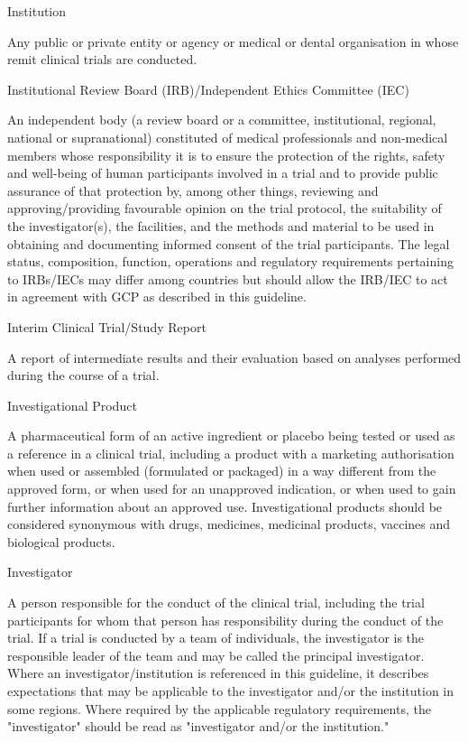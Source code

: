 \documentclass[11pt]{article}
\begin{document}
Institution


Any public or private entity or agency or medical or dental organisation in whose remit clinical trials are conducted.


Institutional Review Board (IRB)/Independent Ethics Committee (IEC)


An independent body (a review board or a committee, institutional, regional, national or supranational) constituted of medical professionals and non-medical members whose responsibility it is to ensure the protection of the rights, safety and well-being of human participants involved in a trial and to provide public assurance of that protection by, among other things, reviewing and approving/providing favourable opinion on the trial protocol, the suitability of the investigator(s), the facilities, and the methods and material to be used in obtaining and documenting informed consent of the trial participants. The legal status, composition, function, operations and regulatory requirements pertaining to IRBs/IECs may differ among countries but should allow the IRB/IEC to act in agreement with GCP as described in this guideline.


Interim Clinical Trial/Study Report


A report of intermediate results and their evaluation based on analyses performed during the course of a trial.


Investigational Product


A pharmaceutical form of an active ingredient or placebo being tested or used as a reference in a clinical trial, including a product with a marketing authorisation when used or assembled (formulated or packaged) in a way different from the approved form, or when used for an unapproved indication, or when used to gain further information about an approved use. Investigational products should be considered synonymous with drugs, medicines, medicinal products, vaccines and biological products.


Investigator


A person responsible for the conduct of the clinical trial, including the trial participants for whom that person has responsibility during the conduct of the trial. If a trial is conducted by a team of individuals, the investigator is the responsible leader of the team and may be called the principal investigator. Where an investigator/institution is referenced in this guideline, it describes expectations that may be applicable to the investigator and/or the institution in some regions. Where required by the applicable regulatory requirements, the "investigator" should be read as "investigator and/or the institution."
\end{document}
